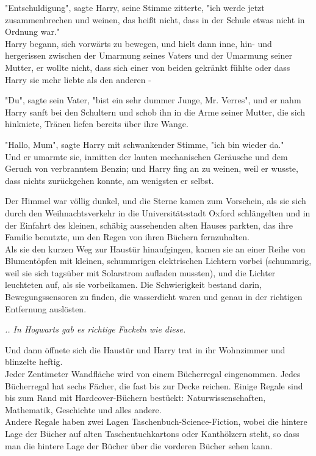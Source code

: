 {"Entschuldigung", sagte Harry, seine Stimme zitterte, "ich werde jetzt zusammenbrechen und weinen, das heißt nicht, dass in der Schule etwas nicht in Ordnung war."\\ Harry begann, sich vorwärts zu bewegen, und hielt dann inne, hin- und hergerissen zwischen der Umarmung seines Vaters und der Umarmung seiner Mutter, er wollte nicht, dass sich einer von beiden gekränkt fühlte oder dass Harry sie mehr liebte als den anderen -

"Du", sagte sein Vater, "bist ein sehr dummer Junge, Mr. Verres", und er nahm Harry sanft bei den Schultern und schob ihn in die Arme seiner Mutter, die sich hinkniete, Tränen liefen bereits über ihre Wange.

"Hallo, Mum", sagte Harry mit schwankender Stimme, "ich bin wieder da."\\ Und er umarmte sie, inmitten der lauten mechanischen Geräusche und dem Geruch von verbranntem Benzin; und Harry fing an zu weinen, weil er wusste, dass nichts zurückgehen konnte, am wenigsten er selbst.

Der Himmel war völlig dunkel, und die Sterne kamen zum Vorschein, als sie sich durch den Weihnachtsverkehr in die Universitätsstadt Oxford schlängelten und in der Einfahrt des kleinen, schäbig aussehenden alten Hauses parkten, das ihre Familie benutzte, um den Regen von ihren Büchern fernzuhalten.\\ Als sie den kurzen Weg zur Haustür hinaufgingen, kamen sie an einer Reihe von Blumentöpfen mit kleinen, schummrigen elektrischen Lichtern vorbei (schummrig, weil sie sich tagsüber mit Solarstrom aufladen mussten), und die Lichter leuchteten auf, als sie vorbeikamen. Die Schwierigkeit bestand darin, Bewegungssensoren zu finden, die wasserdicht waren und genau in der richtigen Entfernung auslösten.

\emph{.. In Hogwarts gab es richtige Fackeln wie diese.}

Und dann öffnete sich die Haustür und Harry trat in ihr Wohnzimmer und blinzelte heftig.\\ Jeder Zentimeter Wandfläche wird von einem Bücherregal eingenommen. Jedes Bücherregal hat sechs Fächer, die fast bis zur Decke reichen. Einige Regale sind bis zum Rand mit Hardcover-Büchern bestückt: Naturwissenschaften, Mathematik, Geschichte und alles andere.\\ Andere Regale haben zwei Lagen Taschenbuch-Science-Fiction, wobei die hintere Lage der Bücher auf alten Taschentuchkartons oder Kanthölzern steht, so dass man die hintere Lage der Bücher über die vorderen Bücher sehen kann.

}
